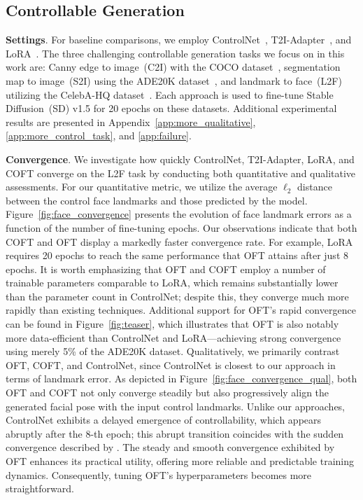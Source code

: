 \subsection{Controllable Generation}

\textbf{Settings}. For baseline comparisons, we employ ControlNet~\cite{zhang2023adding}, T2I-Adapter~\cite{mou2023t2i}, and LoRA~\cite{hulora2022}. The three challenging controllable generation tasks we focus on in this work are: Canny edge to image~(C2I) with the COCO dataset~\cite{lin2014microsoft}, segmentation map to image~(S2I) using the ADE20K dataset~\cite{zhou2017scene}, and landmark to face~(L2F) utilizing the CelebA-HQ dataset~\cite{karras2018progressive,xia2021tedigan}. Each approach is used to fine-tune Stable Diffusion~(SD) v1.5 for 20 epochs on these datasets. Additional experimental results are presented in Appendix~\ref{app:more_qualitative}, \ref{app:more_control_task}, and \ref{app:failure}.

\textbf{Convergence}. We investigate how quickly ControlNet, T2I-Adapter, LoRA, and COFT converge on the L2F task by conducting both quantitative and qualitative assessments. For our quantitative metric, we utilize the average $\ell_2$ distance between the control face landmarks and those predicted by the model. Figure~\ref{fig:face_convergence} presents the evolution of face landmark errors as a function of the number of fine-tuning epochs. Our observations indicate that both COFT and OFT display a markedly faster convergence rate. For example, LoRA requires 20 epochs to reach the same performance that OFT attains after just 8 epochs. It is worth emphasizing that OFT and COFT employ a number of trainable parameters comparable to LoRA, which remains substantially lower than the parameter count in ControlNet; despite this, they converge much more rapidly than existing techniques. Additional support for OFT's rapid convergence can be found in Figure~\ref{fig:teaser}, which illustrates that OFT is also notably more data-efficient than ControlNet and LoRA—achieving strong convergence using merely 5\% of the ADE20K dataset. Qualitatively, we primarily contrast OFT, COFT, and ControlNet, since ControlNet is closest to our approach in terms of landmark error. As depicted in Figure~\ref{fig:face_convergence_qual}, both OFT and COFT not only converge steadily but also progressively align the generated facial pose with the input control landmarks. Unlike our approaches, ControlNet exhibits a delayed emergence of controllability, which appears abruptly after the 8-th epoch; this abrupt transition coincides with the sudden convergence described by \cite{zhang2023adding}. The steady and smooth convergence exhibited by OFT enhances its practical utility, offering more reliable and predictable training dynamics. Consequently, tuning OFT’s hyperparameters becomes more straightforward.

